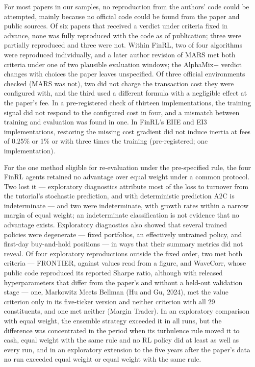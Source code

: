 \documentclass[12pt,a4paper]{report}
\newcounter{none} %
\begin{document}
For most papers in our samples, no reproduction from the authors' code
could be attempted, mainly because no official code could be found from
the paper and public sources. Of six papers that received a verdict
under criteria fixed in advance, none was fully reproduced with the code
as of publication; three were partially reproduced and three were not.
Within FinRL, two of four algorithms were reproduced individually, and a
later author revision of MARS met both criteria under one of two
plausible evaluation windows; the AlphaMix+ verdict changes with choices
the paper leaves unspecified. Of three official environments checked
(MARS was not), two did not charge the transaction cost they were
configured with, and the third used a different formula with a
negligible effect at the paper's fee. In a pre-registered check of
thirteen implementations, the training signal did not respond to the
configured cost in four, and a mismatch between training and evaluation
was found in one. In FinRL's EIIE and EI3 implementations, restoring the
missing cost gradient did not induce inertia at fees of 0.25\% or 1\% or
with three times the training (pre-registered; one implementation).

For the one method eligible for re-evaluation under the pre-specified
rule, the four FinRL agents retained no advantage over equal weight
under a common protocol. Two lost it --- exploratory diagnostics
attribute most of the loss to turnover from the tutorial's stochastic
prediction, and with deterministic prediction A2C is indeterminate ---
and two were indeterminate, with growth rates within a narrow margin of
equal weight; an indeterminate classification is not evidence that no
advantage exists. Exploratory diagnostics also showed that several
trained policies were degenerate --- fixed portfolios, an effectively
untrained policy, and first-day buy-and-hold positions --- in ways that
their summary metrics did not reveal. Of four exploratory reproductions
outside the fixed order, two met both criteria --- FRONTIER, against
values read from a figure, and WaveCorr, whose public code reproduced
its reported Sharpe ratio, although with released hyperparameters that
differ from the paper's and without a held-out validation stage --- one,
Markowitz Meets Bellman (Hu and Gu, 2024), met the value criterion only
in its five-ticker version and neither criterion with all 29
constituents, and one met neither (Margin Trader). In an exploratory
comparison with equal weight, the ensemble strategy exceeded it in all
runs, but the difference was concentrated in the period when its
turbulence rule moved it to cash, equal weight with the same rule and no
RL policy did at least as well as every run, and in an exploratory
extension to the five years after the paper's data no run exceeded equal
weight or equal weight with the same rule.
\end{document}
